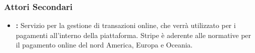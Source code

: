 \subsubsection{Attori Secondari}
\begin{itemize}
\item \textbf{:} Servizio per la gestione di transazioni online, che verrà utilizzato per i pagamenti all'interno della piattaforma. Stripe è aderente alle normative per il pagamento online del nord America, Europa e Oceania.
\end{itemize}
